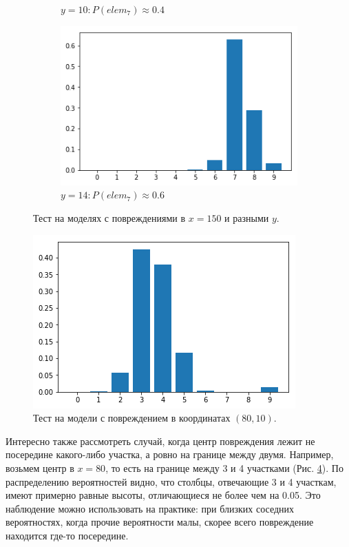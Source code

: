 \documentclass[a4paper,12pt]{article}
\theoremstyle{remark}
\begin{document}
\begin{figure}[h]
\begin{subfigure}{0.33\textwidth}
			\caption{$y=10: P(elem_7)\approx0.4$}
			\label{fig:nn1_damage_150_10}
		\end{subfigure}
		\begin{subfigure}{0.33\textwidth}
			\includegraphics[width=\linewidth]{nn1_damage_150_14.png}
			\caption{$y=14: P(elem_7)\approx0.6$}
			\label{fig:nn1_damage_150_14}
		\end{subfigure}
		\caption{Тест на моделях с повреждениями в $x=150$ и разными $y$.}
		\label{fig:nn1_damage_150}
	\end{figure}

	\begin{figure} 
		\includegraphics[width=\linewidth]{nn1_damage_80_10.png}
		\caption{Тест на модели с повреждением в координатах $(80, 10)$.}
		\label{fig:nn1_damage_80_10}
	\end{figure}
	Интересно также рассмотреть случай, когда центр повреждения лежит не посередине какого-либо участка, а ровно на границе между двумя. Например, возьмем центр в $x=80$, то есть на границе между 3 и 4 участками (Рис. \ref{fig:nn1_damage_80_10}). По распределению вероятностей видно, что столбцы, отвечающие 3 и 4 участкам, имеют примерно равные высоты, отличающиеся не более чем на 0.05. Это наблюдение можно использовать на практике: при близких соседних вероятностях, когда прочие вероятности малы, скорее всего повреждение находится где-то посередине.
	
\end{document}
